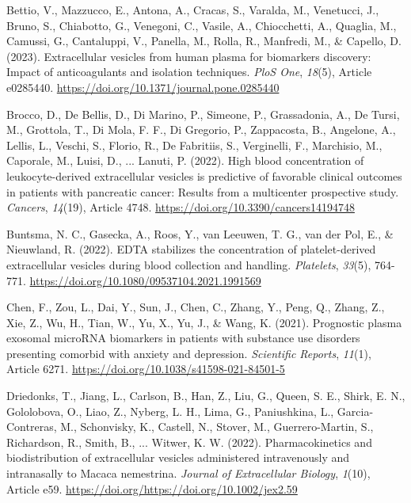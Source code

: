 \documentclass[authordate, empirical]{jote-new-article}
\begin{document}
	Bettio, V., Mazzucco, E., Antona, A., Cracas, S., Varalda, M., Venetucci, J., Bruno, S., Chiabotto, G., Venegoni, C., Vasile, A., Chiocchetti, A., Quaglia, M., Camussi, G., Cantaluppi, V., Panella, M., Rolla, R., Manfredi, M., \& Capello, D. (2023). Extracellular vesicles from human plasma for biomarkers discovery: Impact of anticoagulants and isolation techniques. \emph{PloS One},\emph{ 18}(5), Article e0285440. \url{https://doi.org/10.1371/journal.pone.0285440}



	Brocco, D., De Bellis, D., Di Marino, P., Simeone, P., Grassadonia, A., De Tursi, M., Grottola, T., Di Mola, F. F., Di Gregorio, P., Zappacosta, B., Angelone, A., Lellis, L., Veschi, S., Florio, R., De Fabritiis, S., Verginelli, F., Marchisio, M., Caporale, M., Luisi, D., ... Lanuti, P. (2022). High blood concentration of leukocyte-derived extracellular vesicles is predictive of favorable clinical outcomes in patients with pancreatic cancer: Results from a multicenter prospective study. \emph{Cancers},\emph{ 14}(19), Article 4748. \url{https://doi.org/10.3390/cancers14194748}



	Buntsma, N. C., Gasecka, A., Roos, Y., van Leeuwen, T. G., van der Pol, E., \& Nieuwland, R. (2022). EDTA stabilizes the concentration of platelet-derived extracellular vesicles during blood collection and handling. \emph{Platelets},\emph{ 33}(5), 764-771. \url{https://doi.org/10.1080/09537104.2021.1991569}



	Chen, F., Zou, L., Dai, Y., Sun, J., Chen, C., Zhang, Y., Peng, Q., Zhang, Z., Xie, Z., Wu, H., Tian, W., Yu, X., Yu, J., \& Wang, K. (2021). Prognostic plasma exosomal microRNA biomarkers in patients with substance use disorders presenting comorbid with anxiety and depression. \emph{Scientific Reports},\emph{ 11}(1), Article 6271. \url{https://doi.org/10.1038/s41598-021-84501-5}



	Driedonks, T., Jiang, L., Carlson, B., Han, Z., Liu, G., Queen, S. E., Shirk, E. N., Gololobova, O., Liao, Z., Nyberg, L. H., Lima, G., Paniushkina, L., Garcia-Contreras, M., Schonvisky, K., Castell, N., Stover, M., Guerrero-Martin, S., Richardson, R., Smith, B., ... Witwer, K. W. (2022). Pharmacokinetics and biodistribution of extracellular vesicles administered intravenously and intranasally to Macaca nemestrina. \emph{Journal of Extracellular Biology},\emph{ 1}(10), Article e59. \url{https://doi.org/https://doi.org/10.1002/jex2.59}
\end{document}
